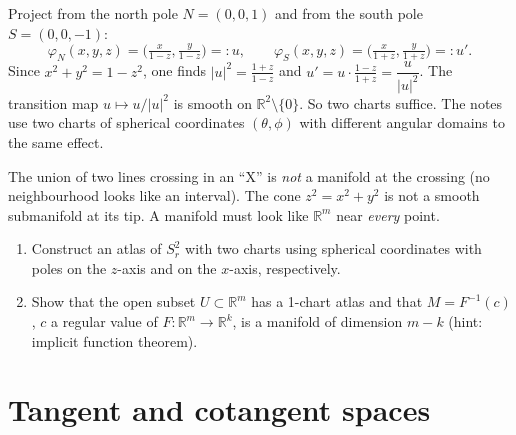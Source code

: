 \documentclass[11pt,a4paper]{article}
\numberwithin{equation}{section}
\theoremstyle{definition}
\theoremstyle{plain}
\newcommand{\R}{\mathbb{R}}
\begin{document}
\begin{example}
Project from the north pole $N=(0,0,1)$ and from the south pole $S=(0,0,-1)$:
\[
\varphi_N(x,y,z)=\Big(\tfrac{x}{1-z},\tfrac{y}{1-z}\Big)=:u,\qquad
\varphi_S(x,y,z)=\Big(\tfrac{x}{1+z},\tfrac{y}{1+z}\Big)=:u'.
\]
Since $x^2+y^2=1-z^2$, one finds $|u|^2=\frac{1+z}{1-z}$ and $u'=u\cdot\frac{1-z}{1+z}=\dfrac{u}{|u|^2}$.
The transition map $u\mapsto u/|u|^2$ is smooth on $\R^2\setminus\{0\}$. So two charts suffice. The notes use two charts of spherical coordinates $(\theta,\phi)$ with different angular domains to the same effect.
\end{example}

\begin{pitfall}
The union of two lines crossing in an ``X'' is \emph{not} a manifold at the crossing (no neighbourhood looks like an interval). The cone $z^2=x^2+y^2$ is not a smooth submanifold at its tip. A manifold must look like $\R^m$ near \emph{every} point.
\end{pitfall}

\begin{exercises}
\begin{enumerate}[nosep]
\item Construct an atlas of $S^2_r$ with two charts using spherical coordinates with poles on the $z$-axis and on the $x$-axis, respectively.
\item Show that the open subset $U\subset\R^m$ has a 1-chart atlas and that $M=F^{-1}(c)$, $c$ a regular value of $F:\R^m\to\R^k$, is a manifold of dimension $m-k$ (hint: implicit function theorem).
\end{enumerate}
\end{exercises}


\section{Tangent and cotangent spaces}\label{sec:tangent}
\end{document}
